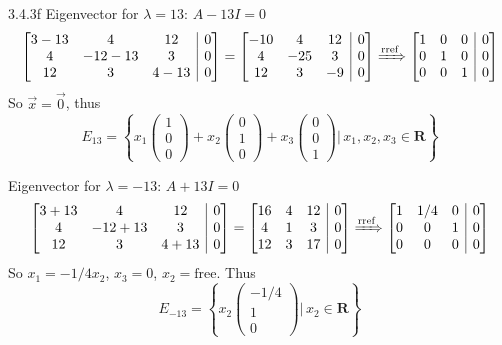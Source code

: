 \documentclass{article}
\makeatletter
\theoremstyle{definition}
\newenvironment{amatrix}[1]{%
	\left[\begin{array}{@{}*{#1}{c}|c@{}}
	}{%
	\end{array}\right]
}
\makeatother
\begin{document}
\begin{prob}{3.4.3f}
    	Eigenvector for $ \lambda=13 $: $ A-13I=0 $
    		\begin{align*}
    			\begin{amatrix}{3} 3-13 & 4 & 12 & 0 \\  4 & -12-13 & 3 & 0 \\ 12 & 3 & 4-13 & 0 \end{amatrix} = \begin{amatrix}{3} -10 & 4 & 12 & 0 \\  4 & -25 & 3 & 0 \\ 12 & 3 & -9 & 0 \end{amatrix} \xRightarrow{\text{rref}} \begin{amatrix}{3} 1 & 0 & 0 & 0 \\  0 & 1 & 0 & 0 \\ 0 & 0 & 1 & 0 \end{amatrix}
    		\end{align*}
    	So $ \vec{x} = \vec{0} $, thus
    		\[
    			E_{13} = \left\{ x_1 \begin{pmatrix} 1\\0\\0 \end{pmatrix} + x_2 \begin{pmatrix} 0\\1\\0 \end{pmatrix} + x_3 \begin{pmatrix} 0\\0\\1 \end{pmatrix} \Bigg| \, x_1,x_2,x_3 \in \mathbf{R} \right\}
    		\]	
    		
    	Eigenvector for $ \lambda = -13 $: $ A+13I=0 $
    		\begin{align*}
    			\begin{amatrix}{3} 3+13 & 4 & 12 & 0 \\  4 & -12+13 & 3 & 0 \\ 12 & 3 & 4+13 & 0 \end{amatrix} = \begin{amatrix}{3} 16 & 4 & 12 & 0 \\  4 & 1 & 3 & 0 \\ 12 & 3 & 17 & 0 \end{amatrix} \xRightarrow{\text{rref}} \begin{amatrix}{3} 1 & 1/4 & 0 & 0 \\  0 & 0 & 1 & 0 \\ 0 & 0 & 0 & 0 \end{amatrix}
    		\end{align*}
    	So $ x_1 = -1/4x_2 $, $ x_3 = 0 $, $ x_2 = \text{free} $. Thus
    		\[
    			E_{-13} = \left\{ x_2 \begin{pmatrix} -1/4\\1\\0 \end{pmatrix} \Bigg| \, x_2 \in \mathbf{R} \right\}
    		\]
    \end{prob}
\end{document}
